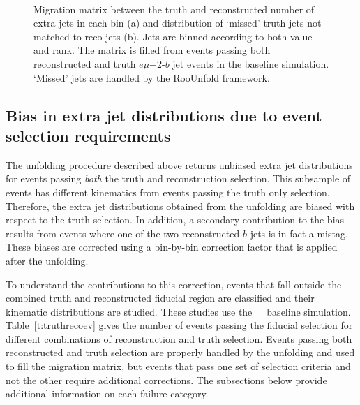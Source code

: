 \begin{figure}
~
~
\caption{Migration matrix between the truth and reconstructed number of extra jets in each bin (a) and distribution of `missed' truth jets not matched to reco jets (b). Jets are binned according to both \pt value and rank. The matrix is filled from events passing both reconstructed and truth $e\mu$+2-$b$ jet events in the baseline \ttbar simulation. `Missed' jets are handled by the RooUnfold framework.}
\label{f:res}
\end{figure}
\subsection{Bias in extra jet distributions due to event selection requirements}
\label{sec:misid}
The unfolding procedure described above returns unbiased extra jet distributions for
events passing \textit{ both} the truth and reconstruction selection.  This subsample of events has
different kinematics from events passing the truth only selection.  Therefore, the extra jet
distributions obtained from the unfolding are biased with respect to the truth selection.
In addition, a secondary contribution to the bias results from events where one of the two reconstructed
$b$-jets is in fact a mistag.
These biases are corrected using a bin-by-bin correction factor that is applied after the unfolding. 

To understand the contributions to this correction, events that fall outside the combined truth and reconstructed
fiducial region are classified and their kinematic distributions are studied. 
These studies use the~\powpy~\ttbar\ baseline simulation. Table~\ref{t:truthrecoev} gives the number of events passing the fiducial selection for different combinations of reconstruction and truth selection.
Events passing both reconstructed and truth selection are properly handled by the unfolding and used to 
fill the migration matrix, but events that pass one set of selection criteria and not the other 
require additional corrections.  The subsections below provide additional information on each
failure category.

